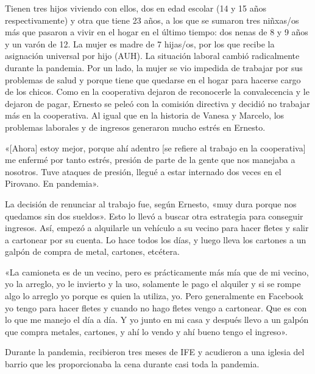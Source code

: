 \begin{refsection}
\begin{gbcita}
\end{gbcita}

Tienen tres hijos viviendo con ellos, dos en edad escolar (14 y 15 años respectivamente) y otra que tiene 23 años, a los que se sumaron tres niñxas/os más que pasaron a vivir en el hogar en el último tiempo: dos nenas de 8 y 9 años y un varón de 12. La mujer es madre de 7 hijas/os, por los que recibe la asignación universal por hijo (AUH). La situación laboral cambió radicalmente durante la pandemia. Por un lado, la mujer se vio impedida de trabajar por sus problemas de salud y porque tiene que quedarse en el hogar para hacerse cargo de los chicos. Como en la cooperativa dejaron de reconocerle la convalecencia y le dejaron de pagar, Ernesto se peleó con la comisión directiva y decidió no trabajar más en la cooperativa. Al igual que en la historia de Vanesa y Marcelo, los problemas laborales y de ingresos generaron mucho estrés en Ernesto.


\begin{gbcita}
«[Ahora] estoy mejor, porque ahí adentro [se refiere al trabajo en la cooperativa] me enfermé por tanto estrés, presión de parte de la gente que nos manejaba a nosotros. Tuve ataques de presión, llegué a estar internado dos veces en el Pirovano. En pandemia».

\end{gbcita}

La decisión de renunciar al trabajo fue, según Ernesto, «muy dura porque nos quedamos sin dos sueldos». Esto lo llevó a buscar otra estrategia para conseguir ingresos. Así, empezó a alquilarle un vehículo a su vecino para hacer fletes y salir a cartonear por su cuenta. Lo hace todos los días, y luego lleva los cartones a un galpón de compra de metal, cartones, etcétera.


\begin{gbcita}
«La camioneta es de un vecino, pero es prácticamente más mía que de mi vecino, yo la arreglo, yo le invierto y la uso, solamente le pago el alquiler y si se rompe algo lo arreglo yo porque es quien la utiliza, yo. Pero generalmente en Facebook yo tengo para hacer fletes y cuando no hago fletes vengo a cartonear. Que es con lo que me manejo el día a día. Y yo junto en mi casa y después llevo a un galpón que compra metales, cartones, y ahí lo vendo y ahí bueno tengo el ingreso».

\end{gbcita}

Durante la pandemia, recibieron tres meses de IFE y acudieron a una iglesia del barrio que les proporcionaba la cena durante casi toda la pandemia.



\end{refsection}
